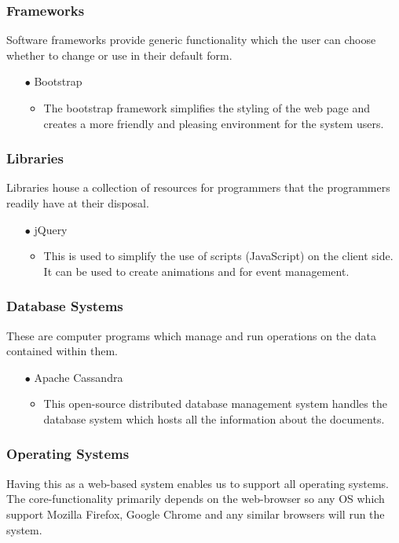 \documentclass[a4paper,12pt]{article}
\begin{document}
\begin{flushleft}
\begin{itemize}
	\end{itemize}
	
	\subsubsection{Frameworks}
	Software frameworks provide generic functionality which the user can choose whether to change or use in their default form.
	
	\begin{itemize}
		\item[$\bullet$] Bootstrap
		\begin{itemize}
		\item The bootstrap framework simplifies the styling of the web page and creates a more friendly and pleasing environment for the system users.	
		\end{itemize}
	\end{itemize}
	
	\subsubsection{Libraries}
	Libraries house a collection of resources for programmers that the programmers readily have at their disposal.
	
	\begin{itemize}
		\item[$\bullet$] jQuery
		\begin{itemize}
		\item This is used to simplify the use of scripts (JavaScript) on the client side. It can be used to create animations and for event management.
		\end{itemize}
	\end{itemize}
	
	\subsubsection{Database Systems}
	These are computer programs which manage and run operations on the data contained within them.
	
	\begin{itemize}
		\item[$\bullet$] Apache Cassandra
		\begin{itemize}
		\item This open-source distributed database management system handles the database system which hosts all the information about the documents.
		\end{itemize}
	\end{itemize}
	
	\subsubsection{Operating Systems}
	Having this as a web-based system enables us to support all operating systems. The core-functionality primarily depends on the web-browser so any OS which support Mozilla Firefox, Google Chrome and any similar browsers will run the system.

\end{flushleft}
\end{document}
